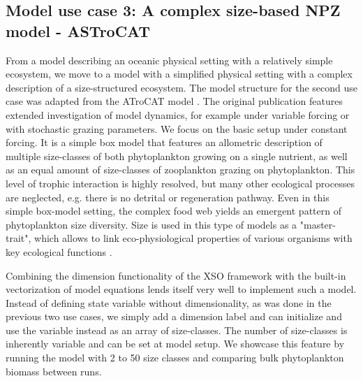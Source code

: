 \documentclass[journal abbreviation, manuscript]{copernicus}
\begin{document}
\subsection{Model use case 3: A complex size-based NPZ model - ASTroCAT}

From a model describing an oceanic physical setting with a relatively simple ecosystem, we move to a model with a simplified physical setting with a complex description of a size-structured ecosystem. The model structure for the second use case was adapted from the ATroCAT model \citep{Banas2011b}. The original publication features extended investigation of model dynamics, for example under variable forcing or with stochastic grazing parameters. We focus on the basic setup under constant forcing. It is a simple box model that features an allometric description of multiple size-classes of both phytoplankton growing on a single nutrient, as well as an equal amount of size-classes of zooplankton grazing on phytoplankton. This level of trophic interaction is highly resolved, but many other ecological processes are neglected, e.g. there is no detrital or regeneration pathway. Even in this simple box-model setting, the complex food web yields an emergent pattern of phytoplankton size diversity. Size is used in this type of models as a "master-trait", which allows to link eco-physiological properties of various organisms with key ecological functions \citep{Litchman2008}. 

Combining the dimension functionality of the XSO framework with the built-in vectorization of model equations lends itself very well to implement such a model. Instead of defining state variable without dimensionality, as was done in the previous two use cases, we simply add a dimension label and can initialize and use the variable instead as an array of size-classes. The number of size-classes is inherently variable and can be set at model setup. We showcase this feature by running the model with 2 to 50 size classes and comparing bulk phytoplankton biomass between runs.
\end{document}
